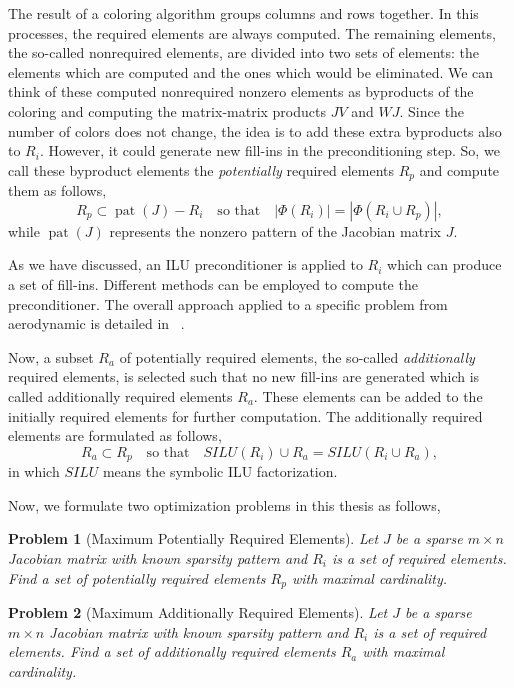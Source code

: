 \documentclass[12pt, twoside,a4paper,toc=bibliography]{scrbook}
\newtheorem{problem}{Problem}
\begin{document}
The result of a coloring algorithm groups columns and rows together.
In this processes, the required elements are always computed.
The remaining elements, the so-called nonrequired elements, 
are divided into two sets of
elements: the elements which are computed and the ones which would be
eliminated. We can think of these computed nonrequired nonzero elements as byproducts
of the coloring and computing the matrix-matrix products $JV$ and $WJ$.
Since the number of colors does not change,
the idea is to add these extra byproducts also to $R_i$.
However, it could generate new fill-ins in the preconditioning step.
So, we call these byproduct elements the \textit{potentially}
required elements $R_p$ and compute them as follows,
$$
R_p \subset \operatorname{pat}(J) - R_i \quad\text{so that}\quad |\Phi(R_i)| = |\Phi(R_i\cup R_p)|,
$$
while $\operatorname{pat}(J)$ represents the nonzero pattern of the Jacobian matrix $J$.

As we have discussed, an ILU preconditioner is applied to $R_i$ which can
produce a set of fill-ins.
Different methods can be employed to compute the preconditioner.
The overall approach applied to a specific problem from aerodynamic is detailed
in ~\cite{cscpaper}.

Now, a subset $R_a$ of potentially required elements, 
the so-called \textit{additionally} required elements,
is selected such that no new fill-ins are generated which is called
additionally required elements $R_a$. These elements can be added to the
initially required elements for further computation.
The additionally required elements are formulated as follows,
$$
R_a \subset R_p \quad\text{so that}\quad SILU(R_i) \cup R_a = SILU(R_i\cup R_a),
$$
in which $SILU$ means the symbolic ILU factorization.

Now, we formulate two optimization problems in this thesis as follows,
\begin{problem}[Maximum Potentially Required Elements]
\label{p:max_pot}
%
Let $J$ be a sparse $m\times n$ Jacobian matrix with known sparsity pattern and
$R_i$ is a set of required elements.
Find a set of potentially required elements $R_p$ with maximal cardinality.
\end{problem}

\begin{problem}[Maximum Additionally Required Elements]
\label{p:max_add}
%
Let $J$ be a sparse $m\times n$ Jacobian matrix with known sparsity pattern and
$R_i$ is a set of required elements.
Find a set of additionally required elements $R_a$ with maximal cardinality.
\end{problem}
\end{document}
